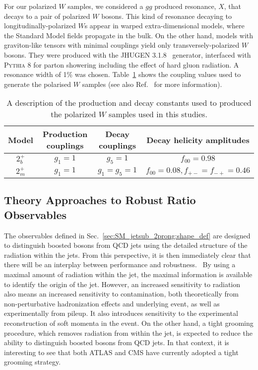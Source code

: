 For our polarized $W$ samples, we considered a $gg$ produced resonance, $X$, that decays to a pair of polarized $W$ bosons.
%
This kind of resonance decaying to longitudinally-polarized $W$s appear in warped extra-dimensional models, where the Standard Model fields propagate in the bulk.
%
On the other hand, models with graviton-like tensors with minimal couplings yield only transversely-polarized $W$ bosons.
%
They were produced with the \textsc{JHUGEN} 3.1.8~\cite{Gao:2010qx,Bolognesi:2012mm} generator, interfaced with \textsc{Pythia} 8 \cite{Sjostrand:2007gs} for parton showering including the effect of hard gluon radiation.
A resonance width of 1\% was chosen.
%
Table~\ref{tab:SM_jetsub_2prong:polarisedSamples} shows the coupling values used to generate the polarised $W$ samples (see also Ref.~\cite{Gao:2010qx} for more information). 

\begin{table}[t]
\centering
\begin{tabular}{|c|c|c|c|}
\hline
Model	&Production couplings	&Decay couplings	&Decay helicity amplitudes 	\\
\hline
$2_b^+$	& $g_1=1$		& $g_5=1$		& $f_{00}=0.98$			\\
$2_m^+$	& $g_1=1$		& $g_1=g_5=1$		& $f_{00}=0.08,f_{+-}=f_{-+}=0.46$\\	
\hline
\end{tabular}
\caption{A description of the production and decay constants used to produced the polarized $W$ samples used in this studies.}
\label{tab:SM_jetsub_2prong:polarisedSamples}
\end{table}



\subsection{Theory Approaches to Robust Ratio Observables}\label{sec:SM_jetsub_2prong:hybrid_ratio}

The observables defined in Sec.~\ref{sec:SM_jetsub_2prong:shape_def} are designed to
distinguish boosted bosons from QCD jets using the detailed structure
of the radiation within the jets.
%
From this perspective, it is then
immediately clear that there will be an interplay between performance
and robustness.\
%
By using a maximal amount of radiation within the jet,
the maximal information is available to identify the origin of the
jet.
%
However, an increased sensitivity to radiation also means an
increased sensitivity to contamination, both theoretically from
non-perturbative hadronization effects and underlying event, as well
as experimentally from pileup.
%
It also introduces sensitivity to the
experimental reconstruction of soft momenta in the event.
% 
On the other
hand, a tight grooming procedure, which removes radiation from within
the jet, is expected to reduce the ability to distinguish boosted
bosons from QCD jets.
%
In that context, it is interesting to see that both ATLAS and CMS
have currently adopted a tight grooming strategy.

